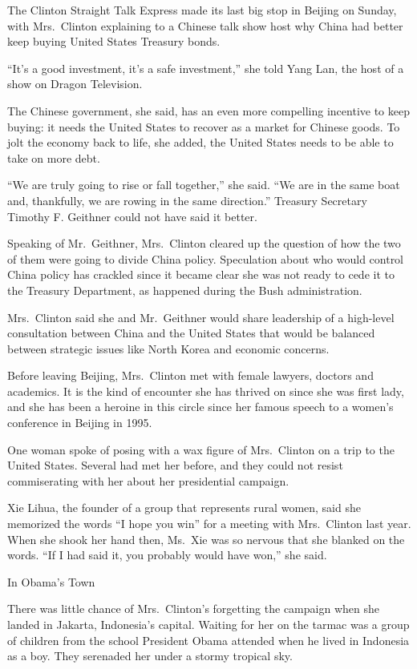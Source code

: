 \documentclass[12pt,a4paper,onecolumn]{article}
\begin{document}
\begin{CJK*}{GBK}{song}
The Clinton Straight Talk Express made its last big stop in Beijing on Sunday, with Mrs.~Clinton
explaining to a Chinese talk show host why China had better keep buying United States Treasury
bonds.

``It's a good investment, it's a safe investment,'' she told Yang Lan, the host of a show on Dragon
Television.

The Chinese government, she said, has an even more compelling incentive to keep buying: it needs the
United States to recover as a market for Chinese goods. To jolt the economy back to life, she added,
the United States needs to be able to take on more debt.

``We are truly going to rise or fall together,'' she said. ``We are in the same boat and,
thankfully, we are rowing in the same direction.'' Treasury Secretary Timothy F. Geithner could not
have said it better.

Speaking of Mr.~Geithner, Mrs.~Clinton cleared up the question of how the two of them were going to
divide China policy. Speculation about who would control China policy has crackled since it became
clear she was not ready to cede it to the Treasury Department, as happened during the Bush
administration.

Mrs.~Clinton said she and Mr.~Geithner would share leadership of a high-level consultation between
China and the United States that would be balanced between strategic issues like North Korea and
economic concerns.

Before leaving Beijing, Mrs.~Clinton met with female lawyers, doctors and academics. It is the kind
of encounter she has thrived on since she was first lady, and she has been a heroine in this circle
since her famous speech to a women's conference in Beijing in 1995.

One woman spoke of posing with a wax figure of Mrs.~Clinton on a trip to the United States. Several
had met her before, and they could not resist commiserating with her about her presidential
campaign.

Xie Lihua, the founder of a group that represents rural women, said she memorized the words ``I hope
you win'' for a meeting with Mrs.~Clinton last year. When she shook her hand then, Ms.~Xie was so
nervous that she blanked on the words. ``If I had said it, you probably would have won,'' she said.

In Obama's Town

There was little chance of Mrs.~Clinton's forgetting the campaign when she landed in Jakarta,
Indonesia's capital. Waiting for her on the tarmac was a group of children from the school President
Obama attended when he lived in Indonesia as a boy. They serenaded her under a stormy tropical sky.


\end{CJK*}
\end{document}
